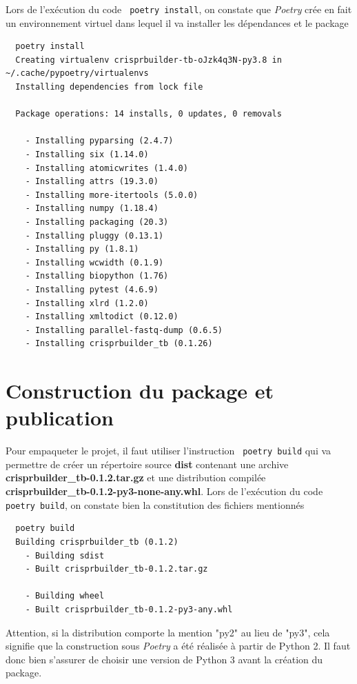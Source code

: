 \documentclass[twoside,a4paper,11pt,frenchb,openany]{report}
\begin{document}
Lors de l'exécution du code \texttt{ poetry install}, on constate que \textit{Poetry} crée en fait un environnement virtuel dans lequel il va installer les dépendances et le package

\begin{verbatim}  poetry install
  Creating virtualenv crisprbuilder-tb-oJzk4q3N-py3.8 in ~/.cache/pypoetry/virtualenvs
  Installing dependencies from lock file

  Package operations: 14 installs, 0 updates, 0 removals

    - Installing pyparsing (2.4.7)
    - Installing six (1.14.0)
    - Installing atomicwrites (1.4.0)
    - Installing attrs (19.3.0)
    - Installing more-itertools (5.0.0)
    - Installing numpy (1.18.4)
    - Installing packaging (20.3)
    - Installing pluggy (0.13.1)
    - Installing py (1.8.1)
    - Installing wcwidth (0.1.9)
    - Installing biopython (1.76)
    - Installing pytest (4.6.9)
    - Installing xlrd (1.2.0)
    - Installing xmltodict (0.12.0)
    - Installing parallel-fastq-dump (0.6.5)
    - Installing crisprbuilder_tb (0.1.26)\end{verbatim}



\section{Construction du package et publication}

Pour empaqueter le projet, il faut utiliser l’instruction
\texttt{ poetry build}
qui va permettre de créer un répertoire source \textbf{dist} contenant une archive \textbf{crisprbuilder\_tb-0.1.2.tar.gz} et une distribution compilée \textbf{crisprbuilder\_tb-0.1.2-py3-none-any.whl}. Lors de l'exécution du code \texttt{ poetry build}, on constate bien la constitution des fichiers mentionnés

\begin{verbatim}  poetry build
  Building crisprbuilder_tb (0.1.2)
    - Building sdist
    - Built crisprbuilder_tb-0.1.2.tar.gz

    - Building wheel
    - Built crisprbuilder_tb-0.1.2-py3-any.whl\end{verbatim}

Attention, si la distribution comporte la mention "py2" au lieu de "py3", cela signifie que la construction sous \textit{Poetry} a été réalisée à partir de Python 2. Il faut donc bien s'assurer de choisir une version de Python 3 avant la création du package.
\end{document}
